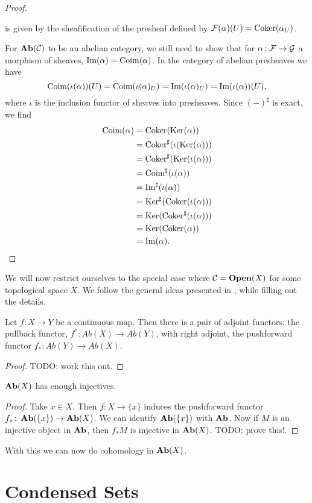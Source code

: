 \documentclass{article}
\DeclareMathOperator{\Open}{\mathbf{Open}}
\begin{document}
\begin{proof}
\begin{itemize}
              is given by the sheafification of the presheaf defined by
              $\mathcal{F}(\alpha)(U) = \operatorname{Coker}(\alpha_U)$.
    \end{itemize}
    For $\operatorname{\mathbf{Ab}}(\mathcal{C})$ to be an abelian category, we still need to
    show that for $\alpha \colon \mathcal{F} \to \mathcal{G}$ a morphism of sheaves,
    $\operatorname{Im}(\alpha) = \operatorname{Coim}(\alpha)$. In the category of abelian presheaves we have
    \begin{equation*}
        \operatorname{Coim}(\iota(\alpha))(U) = \operatorname{Coim}(\iota(\alpha)_U)
        = \operatorname{Im}(\iota(\alpha)_U) = \operatorname{Im}(\iota(\alpha))(U),
    \end{equation*}
    where $\iota$ is the inclusion functor of sheaves into presheaves.
    Since $(-)^\sharp$ is exact, we find
    \begin{align*}
        \operatorname{Coim}(\alpha)
         & = \operatorname{Coker}(\operatorname{Ker}(\alpha))               \\
         & = \operatorname{Coker}^\sharp(\iota(\operatorname{Ker}(\alpha))) \\
         & = \operatorname{Coker}^\sharp(\operatorname{Ker}(\iota(\alpha))) \\
         & = \operatorname{Coim}^\sharp(\iota(\alpha))       \\
         & = \operatorname{Im}^\sharp(\iota(\alpha))         \\
         & = \operatorname{Ker}^\sharp(\operatorname{Coker}(\iota(\alpha))) \\
         & = \operatorname{Ker}(\operatorname{Coker}^\sharp(\iota(\alpha))) \\
         & = \operatorname{Ker}(\operatorname{Coker}(\alpha))               \\
         & = \operatorname{Im}(\alpha).
    \end{align*}
\end{proof}

We will now restrict ourselves to the special case
where $\mcC = \Open(X)$ for some topological space $X$.
We follow the general ideas presented in \cite[Session 1]{Sch2020MasterClass},
while filling out the details.
\begin{prop}
    Let $f \colon X \to Y$ be a continuous map. Then there is a
    pair of adjoint functors: the pullback functor,
    $f^* \colon Ab(X) \to Ab(Y)$, with right adjoint, the pushforward functor
    $f_* \colon Ab(Y) \to Ab(X)$.
\end{prop}
\begin{proof}
    TODO: work this out.
\end{proof}
\begin{lemma}
    $\operatorname{\mathbf{Ab}}(X)$ has enough injectives.
\end{lemma}
\begin{proof}
    Take $x\in X$. Then $f\colon X \to \{x\}$
    induces the pushforward functor $f_* \colon \operatorname{\mathbf{Ab}}(\{x\}) \to \operatorname{\mathbf{Ab}}(X)$.
    We can identify $\operatorname{\mathbf{Ab}}(\{x\})$ with $\operatorname{\mathbf{Ab}}$.
    Now if $M$ is an injective object in $\operatorname{\mathbf{Ab}}$, then $f_*M$ is injective
    in $\operatorname{\mathbf{Ab}}(X)$.
    TODO: prove this!.
\end{proof}

With this we can now do cohomology in $\operatorname{\mathbf{Ab}}(X)$.

\section{Condensed Sets}


\end{document}
